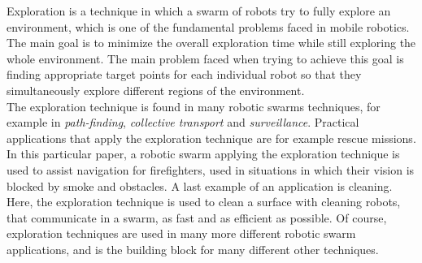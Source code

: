 
Exploration is a technique in which a swarm of robots try to fully explore an environment, which is one of the fundamental problems faced in mobile robotics. 
The main goal is to minimize the overall exploration time while still exploring the whole environment. 
The main problem faced when trying to achieve this goal is finding appropriate target points for each individual robot so that they simultaneously explore different regions of the environment. \cite{burgard2005coordinated} \\
The exploration technique is found in many robotic swarms techniques, for example in \emph{path-finding}, \emph{collective transport} and \emph{surveillance}.
Practical applications that apply the exploration technique are for example rescue missions. \cite{Naghsh2008,Penders2011}
In this particular paper, a robotic swarm applying the exploration technique is used to assist navigation for firefighters, used in situations in which their vision is blocked by smoke and obstacles. 
A last example of an application is cleaning. \cite{wagner2008cooperative}
Here, the exploration technique is used to clean a surface with cleaning robots, that communicate in a swarm, as fast and as efficient as possible. 
Of course, exploration techniques are used in many more different robotic swarm applications, and is the building block for many different other techniques. 

